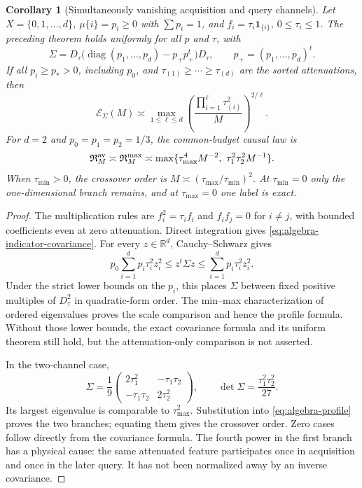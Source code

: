 \documentclass[11pt]{amsart}
\newtheorem{corollary}[theorem]{Corollary}
\theoremstyle{definition}\newtheorem{definition}[theorem]{Definition}
\theoremstyle{remark}\newtheorem{remark}[theorem]{Remark}
\newcommand{\R}{\mathbb R}\newcommand{\N}{\mathbb N}\newcommand{\C}{\mathbb C}
\begin{document}
\begin{corollary}[Simultaneously vanishing acquisition and query channels]
\label{cor:algebra-attenuation}
Let $X=\{0,1,\ldots,d\}$, $\mu\{i\}=p_i\ge0$ with $\sum p_i=1$,
and $f_i=\tau_i\mathbf1_{\{i\}}$, $0\le\tau_i\le1$.
The preceding theorem holds uniformly for all $p$ and $\tau$, with
\begin{equation}\label{eq:algebra-indicator-covariance}
 \Sigma=D_\tau\bigl(\operatorname{diag}(p_1,\ldots,p_d)-p_+p_+^t\bigr)D_\tau,
 \qquad p_+=(p_1,\ldots,p_d)^t.
\end{equation}
If all $p_i\ge p_*>0$, including $p_0$, and
$\tau_{(1)}\ge\cdots\ge\tau_{(d)}$ are the sorted attenuations, then
\[
 \mathcal E_\Sigma(M)\asymp
 \max_{1\le\ell\le d}
       \left(\frac{\prod_{i=1}^\ell\tau_{(i)}^2}{M}\right)^{2/\ell}.
\]
For $d=2$ and $p_0=p_1=p_2=1/3$, the common-budget causal law is
\begin{equation}\label{eq:algebra-two-channel-law}
 \mathfrak R^{\rm av}_{M}\asymp\mathfrak R^{\rm max}_{M}
 \asymp \max\{\tau_{\max}^4M^{-2},\ \tau_1^2\tau_2^2M^{-1}\}.
\end{equation}
When $\tau_{\min}>0$, the crossover order is
$M\asymp(\tau_{\max}/\tau_{\min})^2$. At $\tau_{\min}=0$
only the one-dimensional branch remains, and at $\tau_{\max}=0$
one label is exact.
\end{corollary}
\begin{proof}
The multiplication rules are $f_i^2=\tau_i f_i$ and $f_if_j=0$
for $i\ne j$, with bounded coefficients even at zero attenuation.
Direct integration gives \eqref{eq:algebra-indicator-covariance}.
For every $z\in\R^d$, Cauchy--Schwarz gives
\[
 p_0\sum_{i=1}^d p_i\tau_i^2z_i^2
 \le z^t\Sigma z\le\sum_{i=1}^d p_i\tau_i^2z_i^2.
\]
Under the strict lower bounds on the $p_i$, this places $\Sigma$
between fixed positive multiples of $D_\tau^2$ in quadratic-form
order. The min--max characterization of ordered eigenvalues proves
the scale comparison and hence the profile formula. Without those
lower bounds, the exact covariance formula and its uniform theorem
still hold, but the attenuation-only comparison is not asserted.

In the two-channel case,
\[
 \Sigma=\frac19\begin{pmatrix}2\tau_1^2&-\tau_1\tau_2\\
                      -\tau_1\tau_2&2\tau_2^2\end{pmatrix},
 \qquad \det\Sigma=\frac{\tau_1^2\tau_2^2}{27}.
\]
Its largest eigenvalue is comparable to $\tau_{\max}^2$.
Substitution into \eqref{eq:algebra-profile} proves the two branches;
equating them gives the crossover order. Zero cases follow directly
from the covariance formula. The fourth power in the first branch
has a physical cause: the same attenuated feature participates once
in acquisition and once in the later query. It has not been normalized
away by an inverse covariance.
\end{proof}
\end{document}
